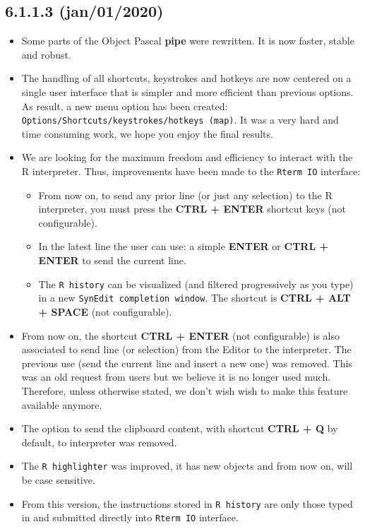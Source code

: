 \subsection*{6.1.1.3 (jan/01/2020)}
\begin{itemize}
  \item Some parts of the Object Pascal \textbf{pipe} were rewritten. It is now faster, stable and robust.
  \item The handling of all shortcuts, keystrokes and hotkeys are now centered on a single user interface
    that is simpler and more efficient than previous options. As result, a new menu option has been
    created: \texttt{Options/Shortcuts/keystrokes/hotkeys (map)}. It was a very hard and time consuming work,
    we hope you enjoy the final results.
  \item We are looking for the maximum freedom and efficiency to interact with the R interpreter.
    Thus, improvements have been made to the \texttt{Rterm IO} interface:
    \begin{itemize}
      \item From now on, to send any prior line (or just any selection) to the R interpreter, you must press the
        \textbf{CTRL + ENTER} shortcut keys (not configurable).
      \item In the latest line the user can use: a simple \textbf{ENTER} or \textbf{CTRL + ENTER} to send the current line.
      \item The \texttt{R history} can be visualized (and filtered progressively as you type) in a new \texttt{SynEdit completion window}.
        The shortcut is \textbf{CTRL + ALT + SPACE} (not configurable).
    \end{itemize}
  \item From now on, the shortcut \textbf{CTRL + ENTER} (not configurable) is also associated to send line (or selection) from the
    Editor to the \RR{} interpreter. The previous use (send the current line and insert a new one) was removed. This was an old request
    from users but we believe it is no longer used much. Therefore, unless otherwise stated, we don't wish wish to make this feature available anymore.
  \item The option to send the clipboard content, with shortcut \textbf{CTRL + Q} by default, to \RR{} interpreter was removed.
  \item The \texttt{R highlighter} was improved, it has new objects and from now on, will be case sensitive.
  \item From this version, the instructions stored in \texttt{R history} are only those typed in and submitted directly into \texttt{Rterm IO} interface.

\end{itemize}
